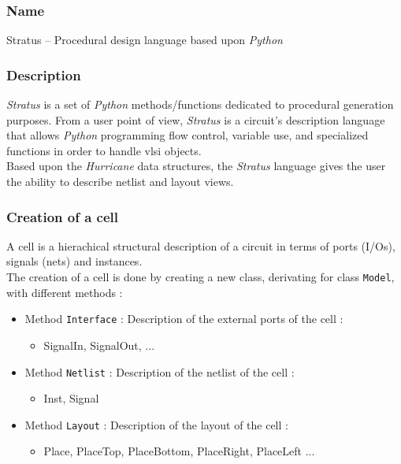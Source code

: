 \subsubsection{Name}

Stratus -- Procedural design language based upon \emph{Python}

\subsubsection{Description}

\emph{Stratus} is a set of \emph{Python} methods/functions dedicated to procedural generation purposes. From a user point of view, \emph{Stratus} is a circuit's description  language that allows \emph{Python} programming flow control, variable use, and specialized functions in order to handle vlsi objects.\\

\indent Based upon the \emph{Hurricane} data structures, the \emph{Stratus} language gives the user the ability to describe netlist and layout views.

\subsubsection{Creation of a cell}

A cell is a hierachical structural description of a circuit in terms of ports (I/Os), signals (nets) and instances.\\
     
\indent The creation of a cell is done by creating a new class, derivating for class \verb-Model-, with different methods :

\begin{itemize}
\item Method \verb-Interface- : Description of the external ports of the cell :
    \begin{itemize}
        \item SignalIn, SignalOut, ...
    \end{itemize}
\item Method \verb-Netlist- : Description of the netlist of the cell :
    \begin{itemize}
        \item Inst, Signal
    \end{itemize}
\item Method \verb-Layout- : Description of the layout of the cell :
    \begin{itemize}
        \item Place, PlaceTop, PlaceBottom, PlaceRight, PlaceLeft ...
    \end{itemize}
\end{itemize}

